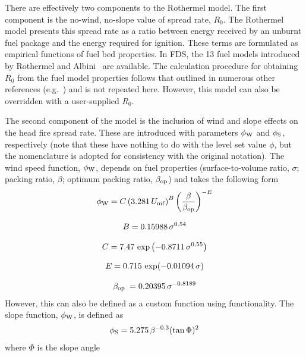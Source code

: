 There are effectively two components to the Rothermel model. The first component is the no-wind, no-slope value of spread rate, $R_0$. The Rothermel model presents this spread rate as a ratio between energy received by an unburnt fuel package and the energy required for ignition. These terms are formulated as empirical functions of fuel bed properties. In FDS, the 13 fuel models introduced by Rothermel and Albini~\cite{Rothermel:1972,Albini:1976} are available. The calculation procedure for obtaining $R_0$ from the fuel model properties follows that outlined in numerous other references (e.g.~\cite{Rothermel:1972,Wilson:1980}) and is not repeated here. However, this model can also be overridden with a user-supplied $R_0$.

The second component of the model is the inclusion of wind and slope effects on the head fire spread rate. These are introduced with parameters $\phi_{\rm W}$ and $\phi_{\rm S}$, respectively (note that these have nothing to do with the level set value $\phi$, but the nomenclature is adopted for consistency with the original notation). The wind speed function, $\phi_{\rm W}$, depends on fuel properties (surface-to-volume ratio, $\sigma$; packing ratio, $\beta$; optimum packing ratio, $\beta_{\rm op}$) and takes the following form
\begin{gather}
\phi_{\rm W} = C\left(3.281 \, U_{\rm mf}\right)^{B}\left(\frac{\beta}{\beta_{\rm op}}\right)^{-E} 
\label{eq:roth_wind} \\[8pt]
B = 0.15988 \, \sigma^{0.54} \\[8pt]
C = 7.47 \, \exp \left(-0.8711 \, \sigma^{0.55}\right) \\[8pt]
E = 0.715 \, \exp (-0.01094 \, \sigma) \\[8pt]
\beta_{\text {op }} = 0.20395 \, \sigma^{-0.8189}
\end{gather}
However, this can also be defined as a custom function using  functionality. The slope function, $\phi_{\rm W}$, is defined as
\begin{equation}
\phi_{\rm S} = 5.275 \, \beta^{-0.3}(\tan \Phi)^{2} \label{eq:roth_slope}
\end{equation}
where $\Phi$ is the slope angle

